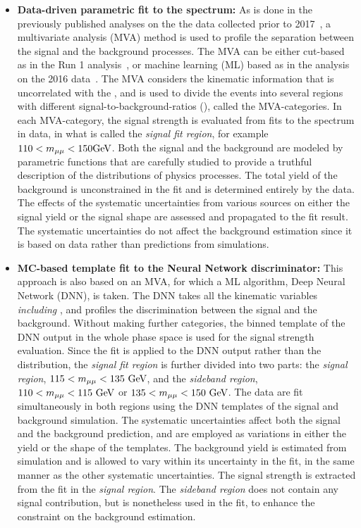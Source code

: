 \begin{itemize}
    \item \textbf{Data-driven parametric fit to the \mmm spectrum:} 
          As is done in the previously published analyses on the the data collected prior to 2017~\cite{2015184, PhysRevLett.122.021801},  
          a multivariate analysis (MVA) method is used to profile the separation between the signal and the background processes. 
          The MVA can be either cut-based as in the Run 1 analysis~\cite{2015184}, or machine learning (ML) based as in the analysis on the 2016 data~\cite{PhysRevLett.122.021801}.
          The MVA considers the kinematic information that is uncorrelated with the \mmm, and is used to divide the events into several regions 
          with different signal-to-background-ratios (\SoB), called the MVA-categories. 
          In each MVA-category, the signal strength is evaluated from fits to the \mmm spectrum in data, in what is called the \textit{signal fit region}, for example $110<m_{\mu\mu}<150 \mbox{GeV}$.
          Both the signal and the background are modeled by parametric functions that are carefully studied to provide a truthful description of the distributions of physics processes. 
          The total yield of the background is unconstrained in the fit and is determined entirely by the data.
          The effects of the systematic uncertainties from various sources on either the signal yield or the signal shape are assessed and propagated to the fit result. 
          The systematic uncertainties do not affect the background estimation since it is based on data rather than predictions from simulations.
    \item \textbf{MC-based template fit to the Neural Network discriminator:}
          This approach is also based on an MVA, for which a ML algorithm, Deep Neural Network (DNN), is taken.
          The DNN takes all the kinematic variables \textit{including \mmm}, and profiles the discrimination between the signal and the background.
          Without making further categories, the binned template of the DNN output in the whole phase space is used for the signal strength evaluation.
          Since the fit is applied to the DNN output rather than the \mmm distribution, the \textit{signal fit region} is further divided into two parts:
          the \textit{signal region}, $115<m_{\mu\mu}<135 ~\mbox{GeV}$, and the \textit{sideband region}, $110<m_{\mu\mu}<115 ~\mbox{GeV}$ or $135<m_{\mu\mu}<150 ~\mbox{GeV}$.
          The data are fit simultaneously in both regions using the DNN templates of the signal and background simulation. 
          The systematic uncertainties affect both the signal and the background prediction, and are employed as variations in either the yield or the shape of the templates.
          The background yield is estimated from simulation and is allowed to vary within its uncertainty in the fit, in the same manner as the other systematic uncertainties.
          The signal strength is extracted from the fit in the \textit{signal region}.
          The \textit{sideband region} does not contain any signal contribution, but is nonetheless used in the fit, to enhance the constraint on the background estimation.
\end{itemize}

